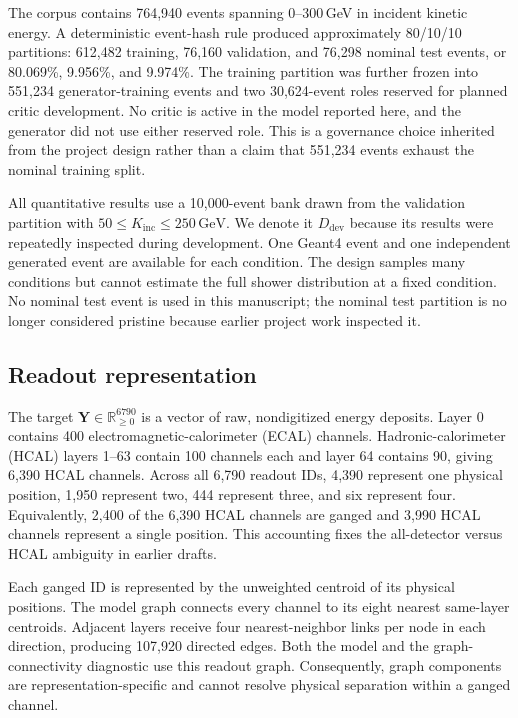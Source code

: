 \documentclass[11pt]{article}
\newcommand{\GeV}{\,\mathrm{GeV}}
\newcommand{\Kinc}{K_{\mathrm{inc}}}
\newcommand{\Y}{\mathbf{Y}}
\newcommand{\Ddev}{D_{\mathrm{dev}}}
\begin{document}
The corpus contains 764,940 events spanning 0--300\,GeV in incident kinetic energy. A deterministic event-hash rule produced approximately 80/10/10 partitions: 612,482 training, 76,160 validation, and 76,298 nominal test events, or 80.069\%, 9.956\%, and 9.974\%. The training partition was further frozen into 551,234 generator-training events and two 30,624-event roles reserved for planned critic development. No critic is active in the model reported here, and the generator did not use either reserved role. This is a governance choice inherited from the project design rather than a claim that 551,234 events exhaust the nominal training split.

All quantitative results use a 10,000-event bank drawn from the validation partition with $50\leq\Kinc\leq250\GeV$. We denote it $\Ddev$ because its results were repeatedly inspected during development. One Geant4 event and one independent generated event are available for each condition. The design samples many conditions but cannot estimate the full shower distribution at a fixed condition. No nominal test event is used in this manuscript; the nominal test partition is no longer considered pristine because earlier project work inspected it.

\subsection{Readout representation}

The target $\Y\in\mathbb R_{\geq0}^{6790}$ is a vector of raw, nondigitized energy deposits. Layer 0 contains 400 electromagnetic-calorimeter (ECAL) channels. Hadronic-calorimeter (HCAL) layers 1--63 contain 100 channels each and layer 64 contains 90, giving 6,390 HCAL channels. Across all 6,790 readout IDs, 4,390 represent one physical position, 1,950 represent two, 444 represent three, and six represent four. Equivalently, 2,400 of the 6,390 HCAL channels are ganged and 3,990 HCAL channels represent a single position. This accounting fixes the all-detector versus HCAL ambiguity in earlier drafts.

Each ganged ID is represented by the unweighted centroid of its physical positions. The model graph connects every channel to its eight nearest same-layer centroids. Adjacent layers receive four nearest-neighbor links per node in each direction, producing 107,920 directed edges. Both the model and the graph-connectivity diagnostic use this readout graph. Consequently, graph components are representation-specific and cannot resolve physical separation within a ganged channel.
\end{document}
